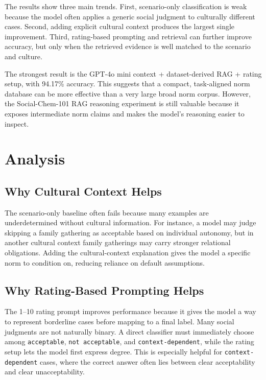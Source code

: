 The results show three main trends. First, scenario-only classification is weak because the model often applies a generic social judgment to culturally different cases. Second, adding explicit cultural context produces the largest single improvement. Third, rating-based prompting and retrieval can further improve accuracy, but only when the retrieved evidence is well matched to the scenario and culture.

The strongest result is the GPT-4o mini context + dataset-derived RAG + rating setup, with 94.17\% accuracy. This suggests that a compact, task-aligned norm database can be more effective than a very large broad norm corpus. However, the Social-Chem-101 RAG reasoning experiment is still valuable because it exposes intermediate norm claims and makes the model's reasoning easier to inspect.

\section{Analysis}

\subsection{Why Cultural Context Helps}

The scenario-only baseline often fails because many examples are underdetermined without cultural information. For instance, a model may judge skipping a family gathering as acceptable based on individual autonomy, but in another cultural context family gatherings may carry stronger relational obligations. Adding the cultural-context explanation gives the model a specific norm to condition on, reducing reliance on default assumptions.

\subsection{Why Rating-Based Prompting Helps}

The 1--10 rating prompt improves performance because it gives the model a way to represent borderline cases before mapping to a final label. Many social judgments are not naturally binary. A direct classifier must immediately choose among \texttt{acceptable}, \texttt{not acceptable}, and \texttt{context-dependent}, while the rating setup lets the model first express degree. This is especially helpful for \texttt{context-dependent} cases, where the correct answer often lies between clear acceptability and clear unacceptability.

